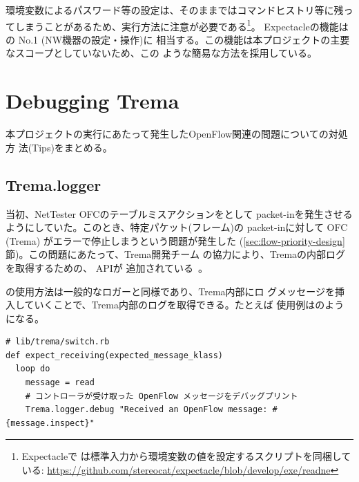 環境変数によるパスワード等の設定は、そのままではコマンドヒストリ等に残っ
てしまうことがあるため、実行方法に注意が必要である\footnote{Expectacleで
は標準入力から環境変数の値を設定するスクリプトを同梱している:
\url{https://github.com/stereocat/expectacle/blob/develop/exe/readne}}。
Expectacleの機能はの No.1 (NW機器の設定・操作)に
相当する。この機能は本プロジェクトの主要なスコープとしていないため、この
ような簡易な方法を採用している。

 \section{Debugging Trema}
 \label{sec:debugging-trema}

本プロジェクトの実行にあたって発生したOpenFlow関連の問題についての対処方
法(Tips)をまとめる。

  \subsection{Trema.logger}
  \label{sec:trema-logger}

当初、NetTester OFCのテーブルミスアクションをとして
packet-inを発生させるようにしていた。このとき、特定パケット(フレーム)の
packet-inに対して OFC (Trema) がエラーで停止しまうという問題が発生した
(\ref{sec:flow-priority-design}節)。この問題にあたって、Trema開発チーム
の協力により、Tremaの内部ログを取得するための、 APIが
追加されている~\cite{trema-logger-doc}。

の使用方法は一般的なロガーと同様であり、Trema内部にロ
グメッセージを挿入していくことで、Trema内部のログを取得できる。たとえば
使用例はのようになる。
\begin{lstlisting}[caption=\code{Trema.logger}使用例,label=lst:trema-logger-example]
# lib/trema/switch.rb
def expect_receiving(expected_message_klass)
  loop do
    message = read
    # コントローラが受け取った OpenFlow メッセージをデバッグプリント
    Trema.logger.debug "Received an OpenFlow message: #{message.inspect}"
\end{lstlisting}


